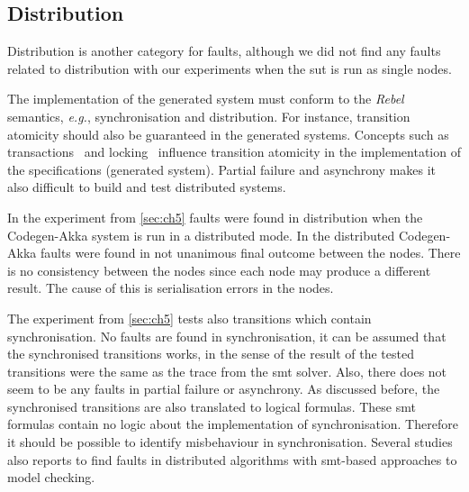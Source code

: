 \subsection{Distribution}
Distribution is another category for faults, although we did not find any faults
related to distribution with our experiments when the \gls{sut} is run as single
nodes.

The implementation of the generated system must conform to the
\textit{Rebel} semantics, \textit{e.g.}, synchronisation and distribution. For
instance, transition atomicity should also be guaranteed in the generated
systems. Concepts such as transactions~\cite[p.~6]{tanenbaum2017distributed} and
locking~\cite[p.~10]{tanenbaum2017distributed} influence transition atomicity in
the implementation of the specifications (generated system). Partial failure
and asynchrony makes it also difficult to build and test distributed
systems.~\cite[p.~1]{mccaffrey2016verification}

In the experiment from \autoref{sec:ch5} faults were found in
distribution when the Codegen-Akka system is run in a distributed mode. In the
distributed Codegen-Akka faults were found in not unanimous final outcome
between the nodes. There is no consistency between the nodes since each node may
produce a different result. The cause of this is serialisation errors in the
nodes.

The experiment from \autoref{sec:ch5} tests also transitions which contain
synchronisation. No faults are found in synchronisation, it can be assumed that
the synchronised transitions works, in the sense of the result of the tested
transitions were the same as the trace from the \gls{smt} solver.
Also, there does not seem to be any faults in partial failure or asynchrony.
As discussed before, the synchronised transitions are also translated to logical
formulas.
These \gls{smt} formulas contain no logic about the implementation of
synchronisation. Therefore it should be possible to identify misbehaviour in
synchronisation. Several studies also reports to find faults in distributed
algorithms with \gls{smt}-based approaches to model
checking.~\cite{konnov2015you, alberti2015smt, mccaffrey2016verification}
